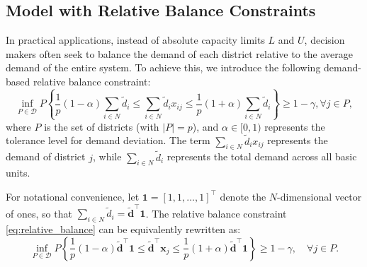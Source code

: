 \documentclass[preprint,12pt,authoryear]{elsarticle}
\begin{document}

\subsection{Model with Relative Balance Constraints}

In practical applications, instead of absolute capacity limits $L$ and $U$, decision makers often seek to balance the demand of each district relative to the average demand of the entire system. To achieve this, we introduce the following demand-based relative balance constraint:
\begin{equation}
\inf_{P \in \mathcal{D}} P \left\{ \frac{1}{p}(1 - \alpha)\sum_{i \in N}\tilde{d}_i \leqslant \sum_{i \in N} \tilde{d}_i x_{ij} \leqslant \frac{1}{p}(1 + \alpha)\sum_{i \in N}\tilde{d}_i \right\} \geqslant 1 - \gamma,  \forall j \in P,
\label{eq:relative_balance}
\end{equation}
where $P$ is the set of districts (with $|P|=p$), and $\alpha \in [0, 1)$ represents the tolerance level for demand deviation. The term $\sum_{i \in N} \tilde{d}_i x_{ij}$ represents the demand of district $j$, while $\sum_{i \in N}\tilde{d}_i$ represents the total demand across all basic units.

For notational convenience, let $\mathbf{1} = [1, 1, \ldots, 1]^\top$ denote the $N$-dimensional vector of ones, so that $\sum_{i \in N}\tilde{d}_i = \tilde{\mathbf{d}}^\top \mathbf{1}$. The relative balance constraint \eqref{eq:relative_balance} can be equivalently rewritten as:
\begin{equation}
\inf_{P \in \mathcal{D}} P \left\{ \frac{1}{p}(1 - \alpha)\tilde{\mathbf{d}}^\top \mathbf{1} \leqslant \tilde{\mathbf{d}}^\top \mathbf{x}_j \leqslant \frac{1}{p}(1 + \alpha)\tilde{\mathbf{d}}^\top \mathbf{1} \right\} \geqslant 1 - \gamma, \quad \forall j \in P.
\label{eq:dricc_rel_joint}
\end{equation}
\end{document}
